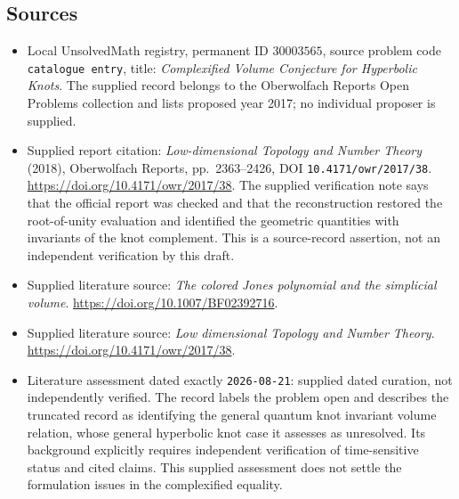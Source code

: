 \documentclass[11pt]{article}
\begin{document}
\subsection{Sources}
\begin{itemize}
\item Local UnsolvedMath registry, permanent ID \(30003565\), source problem code \texttt{catalogue entry}, title: \emph{Complexified Volume Conjecture for Hyperbolic Knots}. The supplied record belongs to the Oberwolfach Reports Open Problems collection and lists proposed year 2017; no individual proposer is supplied.
\item Supplied report citation: \emph{Low-dimensional Topology and Number Theory} (2018), Oberwolfach Reports, pp.\ 2363--2426, DOI \texttt{10.4171/owr/2017/38}. \url{https://doi.org/10.4171/owr/2017/38}. The supplied verification note says that the official report was checked and that the reconstruction restored the root-of-unity evaluation and identified the geometric quantities with invariants of the knot complement. This is a source-record assertion, not an independent verification by this draft.
\item Supplied literature source: \emph{The colored Jones polynomial and the simplicial volume}. \url{https://doi.org/10.1007/BF02392716}.
\item Supplied literature source: \emph{Low dimensional Topology and Number Theory}. \url{https://doi.org/10.4171/owr/2017/38}.
\item Literature assessment dated exactly \texttt{2026-08-21}: supplied dated curation, not independently verified. The record labels the problem open and describes the truncated record as identifying the general quantum knot invariant volume relation, whose general hyperbolic knot case it assesses as unresolved. Its background explicitly requires independent verification of time-sensitive status and cited claims. This supplied assessment does not settle the formulation issues in the complexified equality.
\end{itemize}
\end{document}
